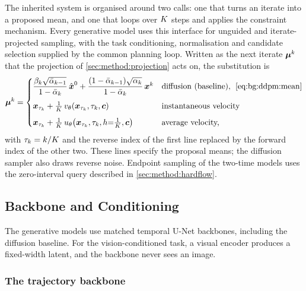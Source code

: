 The inherited system is organised around two calls: one that turns an iterate into a proposed
mean, and one that loops over $K$ steps and applies the constraint mechanism. Every generative model
uses this interface for unguided and iterate-projected sampling, with the task
conditioning, normalisation and candidate selection supplied by the common planning loop. Written as the next iterate $\boldsymbol{\mu}^{k}$ that the projection of
\autoref{sec:method:projection} acts on, the substitution is
\begin{equation}\label{eq:method:engine:iface}
  \boldsymbol{\mu}^{k}
  = \begin{cases}
      \dfrac{\beta_{k}\sqrt{\bar{\alpha}_{k-1}}}{1-\bar{\alpha}_{k}}\,\hat{\boldsymbol{x}}^{0}
        + \dfrac{(1-\bar{\alpha}_{k-1})\sqrt{\alpha_{k}}}{1-\bar{\alpha}_{k}}\,\boldsymbol{x}^{k}
        & \text{diffusion (baseline),\; \eqref{eq:bg:ddpm:mean}}\\[10pt]
      \boldsymbol{x}_{\tau_{k}} + \tfrac{1}{K}\,
        v_{\theta}\!\left(\boldsymbol{x}_{\tau_{k}},\tau_{k},\boldsymbol{c}\right)
        & \text{instantaneous velocity}\\[6pt]
      \boldsymbol{x}_{\tau_{k}} + \tfrac{1}{K}\,
        u_{\theta}\!\left(\boldsymbol{x}_{\tau_{k}},\tau_{k},h{=}\tfrac{1}{K},\boldsymbol{c}\right)
        & \text{average velocity,}
    \end{cases}
\end{equation}
with $\tau_{k} = k/K$ and the reverse index of the first line replaced by the forward index
of the other two. These lines specify the proposal means; the diffusion sampler also draws reverse
noise. Endpoint sampling of the two-time models uses the zero-interval query described in
\autoref{sec:method:hardflow}.

\subsection{Backbone and Conditioning}\label{sec:method:backbone}

The generative models use matched temporal U-Net backbones, including the diffusion baseline. For the vision-conditioned task, a visual encoder produces a fixed-width latent, and the
backbone never sees an image.

\subsubsection*{The trajectory backbone}


